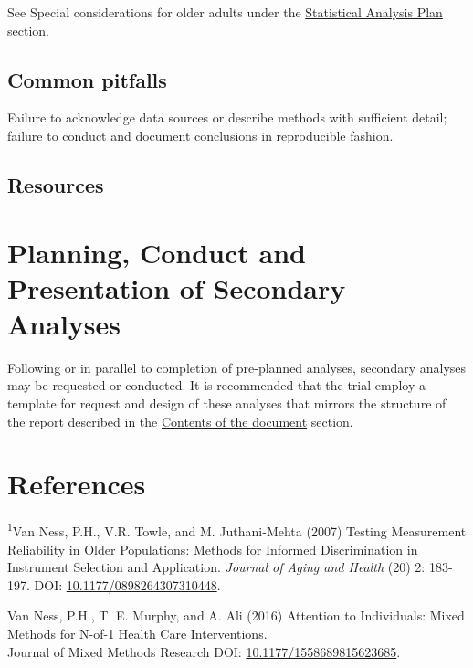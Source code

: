 \documentclass[]{book}
\theoremstyle{definition}
\theoremstyle{definition}
\theoremstyle{definition}
\theoremstyle{remark}
\begin{document}
See Special considerations for older adults under the
\href{https://ifar-isac.github.io/book/experimental-design-and-statistical-considerations.html\#special-considerations-for-older-adults-1}{Statistical
Analysis Plan} section.

\subsection{Common pitfalls}\label{common-pitfalls-2}

Failure to acknowledge data sources or describe methods with sufficient
detail; failure to conduct and document conclusions in reproducible
fashion.

\subsection{Resources}\label{resources-2}

\section{Planning, Conduct and Presentation of Secondary
Analyses}\label{planning-conduct-and-presentation-of-secondary-analyses}

Following or in parallel to completion of pre-planned analyses,
secondary analyses may be requested or conducted. It is recommended that
the trial employ a template for request and design of these analyses
that mirrors the structure of the report described in the
\protect\hyperlink{contents-of-the-document-1}{Contents of the document}
section.

\section{References}\label{references}

\textsuperscript{1}Van Ness, P.H., V.R. Towle, and M. Juthani-Mehta
(2007) Testing Measurement Reliability in Older Populations: Methods for
Informed Discrimination in Instrument Selection and Application.
\emph{Journal of Aging and Health} (20) 2: 183-197. DOI:
\href{http://citeseerx.ist.psu.edu/viewdoc/download?doi=10.1.1.1028.3797\&rep=rep1\&type=pdf}{10.1177/0898264307310448}.

Van Ness, P.H., T. E. Murphy, and A. Ali (2016) Attention to
Individuals: Mixed Methods for N-of-1 Health Care Interventions.\\
Journal of Mixed Methods Research DOI:
\href{https://doi.org/10.1177/1558689815623685}{10.1177/1558689815623685}.
\end{document}
